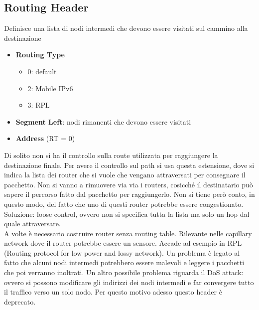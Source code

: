 \documentclass{article}
\begin{document}
\subsection{Routing Header}
Definisce una lista di nodi intermedi che devono essere visitati sul cammino alla destinazione
\begin{itemize}
    \item \textbf{Routing Type}
    \begin{itemize}
        \item 0: default
        \item 2: Mobile IPv6
        \item 3: RPL
    \end{itemize}
    \item \textbf{Segment Left}: nodi rimanenti che devono essere visitati
    \item \textbf{Address} (RT = 0)
\end{itemize}
Di solito non si ha il controllo sulla route utilizzata per raggiungere la destinazione finale. Per avere il controllo sul path si usa questa estensione, dove si indica la lista dei router che si vuole che vengano attraversati per consegnare il pacchetto. Non si vanno a rimuovere via via i routers, cosicché il destinatario può sapere il percorso fatto dal pacchetto per raggiungerlo. Non si tiene però conto, in questo modo, del fatto che uno di questi router potrebbe essere congestionato. Soluzione: loose control, ovvero non si specifica tutta la lista ma solo un hop dal quale attraversare. \\ A volte è necessario costruire router senza routing table. Rilevante nelle capillary network dove il router potrebbe essere un sensore. Accade ad esempio in RPL (Routing protocol for low power and lossy network). Un problema è legato al fatto che alcuni nodi intermedi potrebbero essere malevoli e leggere i pacchetti che poi verranno inoltrati. Un altro possibile problema riguarda il DoS attack: ovvero si possono modificare gli indirizzi dei nodi intermedi e far convergere tutto il traffico verso un solo nodo. Per questo motivo adesso questo header è deprecato.
\end{document}
